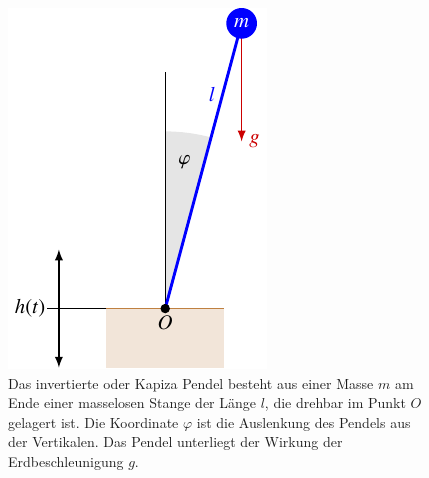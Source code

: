 %
%
%
\begin{figure}
\centering
\includegraphics{chapters/090-mechanik/images/kapiza.pdf}
\caption{Das invertierte oder Kapiza Pendel besteht aus einer Masse $m$
am Ende einer masselosen Stange der Länge $l$, die drehbar im Punkt $O$
gelagert ist.
Die Koordinate $\varphi$ ist die Auslenkung des Pendels aus der Vertikalen.
Das Pendel unterliegt der Wirkung der Erdbeschleunigung $g$.
\label{buch:mechanik:lagrange:fig:kapiza}}
\end{figure}

